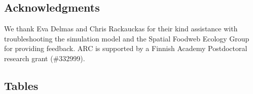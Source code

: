 \documentclass[12pt]{article}
\begin{document}
\begin{spacing}{2.0}
\section*{Acknowledgments}

	We thank Eva Delmas and Chris Rackauckas for their kind assistance with troubleshooting the simulation model and the Spatial Foodweb Ecology Group for providing feedback. ARC is supported by a Finnish Academy Postdoctoral research grant (\#332999). 


     

\clearpage
\end{spacing}

\begin{landscape}
\section*{Tables}


\end{landscape}
\end{document}
